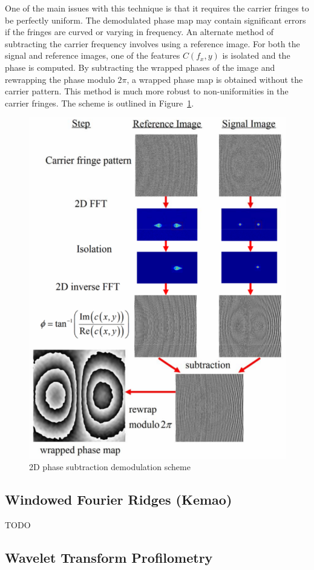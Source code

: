 \documentclass[11pt]{article} %
\begin{document}
One of the main issues with this technique is that it requires the carrier fringes to be perfectly uniform. The demodulated phase map may contain significant errors if the fringes are curved or varying in frequency. 
An alternate method of subtracting the carrier frequency involves using a reference image. For both the signal and reference images, one of the features $C(f_x, y)$ is isolated and the phase is computed. By subtracting the wrapped phases of the image and rewrapping the phase modulo $2 \pi$, a wrapped phase map is obtained without the carrier pattern. This method is much more robust to non-uniformities in the carrier fringes. The scheme is outlined in Figure~\ref{fig:curvedFFT}.

\begin{figure}
	\centering
	\includegraphics[width=0.75\linewidth]{fig/curvedFFT}
	\caption{2D phase subtraction demodulation scheme}
	\label{fig:curvedFFT}
\end{figure}

\subsection{Windowed Fourier Ridges (Kemao)}
TODO
\subsection{Wavelet Transform Profilometry}
\end{document}
